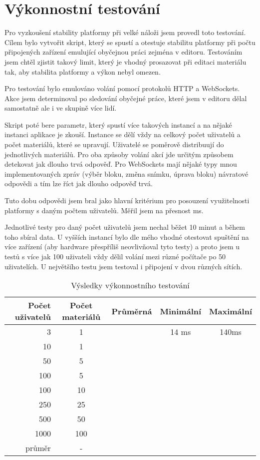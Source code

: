 \section{Výkonnostní testování}\label{text:testovani/vykon}

Pro vyzkoušení stability platformy při velké náloži jsem provedl toto testování.
Cílem bylo vytvořit skript, který se spustí a otestuje stabilitu platformy při počtu připojených zařízení emulující obyčejnou práci zejména v editoru.
Testováním jsem chtěl zjistit takový limit, který je vhodný prosazovat při editaci materiálu tak, aby stabilita platformy a výkon nebyl omezen.

Pro testování bylo emulováno volání pomocí protokolů HTTP a WebSockets.
Akce jsem determinoval po sledování obyčejné práce, které jsem v editoru dělal samostatně ale i ve skupině více lidí.

Skript poté bere parametr, který spustí více takových instancí a na nějaké instanci aplikace je zkouší.
Instance se dělí vždy na celkový počet uživatelů a počet materiálů, které se upravují.
Uživatelé se poměrově distribuují do jednotlivých materiálů.
Pro oba způsoby volání akcí jde určitým způsobem detekovat jak dlouho trvá odpověď.
Pro WebSockets mají nějaké typy mnou implementovaných zpráv (výběr bloku, změna snímku, úprava bloku) návratové odpovědi a tím lze říct jak dlouho odpověď trvá.

Tuto dobu odpovědi jsem bral jako hlavní kritérium pro posouzení využitelnosti platformy s daným počtem uživatelů.
Měřil jsem na přesnost ms.

Jednotlivé testy pro daný počet uživatelů jsem nechal běžet 10 minut a během toho sbíral data.
U vyšších instancí bylo dle mého vhodné otestovat spuštění na více zařízení (aby hardware přespříliš neovlivňoval tyto testy) a proto jsem u testů s více jak 100 uživateli vždy dělil volání mezi různé počítače po 50 uživatelích.
U největšího testu jsem testoval i připojení v dvou různých sítích.

\begin{table}[ht!]
    \caption{Výsledky výkonnostního testování}\label{tab:vysledkyTestovani}
    \centering
    \begin{tabular}{r|c|c|c|c}
        Počet uživatelů & Počet materiálů & Průměrná & Minimální & Maximální\\\hline\hline
        3 & 1 &  & 14 ms & 140ms \\\hline
        10 & 1 &  &  & \\\hline
        50 & 5 &  &  & \\\hline
        100 & 5 &  &  & \\\hline
        100 & 10 &  &  & \\\hline
        250 & 25 &  &  & \\\hline
        500 & 50 &  &  & \\\hline
        1000 & 100 &  &  & \\\hline\hline
        průměr & - & &  & 
    \end{tabular}
\end{table}


